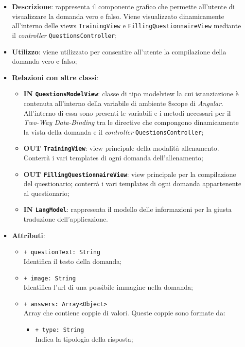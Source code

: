 		\begin{itemize}
			\item \textbf{Descrizione}: rappresenta il componente grafico che permette all'utente di visualizzare la domanda vero e falso. Viene visualizzato dinamicamente all'interno delle views \texttt{TrainingView} e \texttt{FillingQuestionnaireView} mediante il \textit{controller} \texttt{QuestionsController};
			\item \textbf{Utilizzo}: viene utilizzato per consentire all'utente la compilazione della domanda vero e falso;
			\item \textbf{Relazioni con altre classi}: 
			\begin{itemize}
				\item \textbf{IN \texttt{QuestionsModelView}}: classe di tipo modelview la cui istanziazione è contenuta all'interno della variabile di ambiente \$scope di \textit{Angular}. All'interno di essa sono presenti le variabili e i metodi necessari per il \textit{Two-Way Data-Binding} tra le directive che compongono dinamicamente la vista della domanda e il \textit{controller} \texttt{QuestionsController};
				\item \textbf{OUT \texttt{TrainingView}}: view principale della modalità allenamento. Conterrà i vari templates di ogni domanda dell'allenamento;
				\item \textbf{OUT \texttt{FillingQuestionnaireView}}: view principale per la compilazione del questionario; conterrà i vari templates di ogni domanda appartenente al questionario;   
				\item \textbf{IN \texttt{LangModel}}: rappresenta il modello delle informazioni per la giusta traduzione dell'applicazione.
			\end{itemize}
			\item \textbf{Attributi}: 
			\begin{itemize}
				\item \texttt{+ questionText: String} \\ Identifica il testo della domanda;
				\item \texttt{+ image: String} \\ Identifica l'url di una possibile immagine nella domanda;
				\item \texttt{+ answers: Array<Object>} \\ Array che contiene coppie di valori. Queste coppie sono formate da:
				\begin{itemize}
					\item \texttt{+ type: String} \\ Indica la tipologia della risposta;

\end{itemize}
\end{itemize}
\end{itemize}

